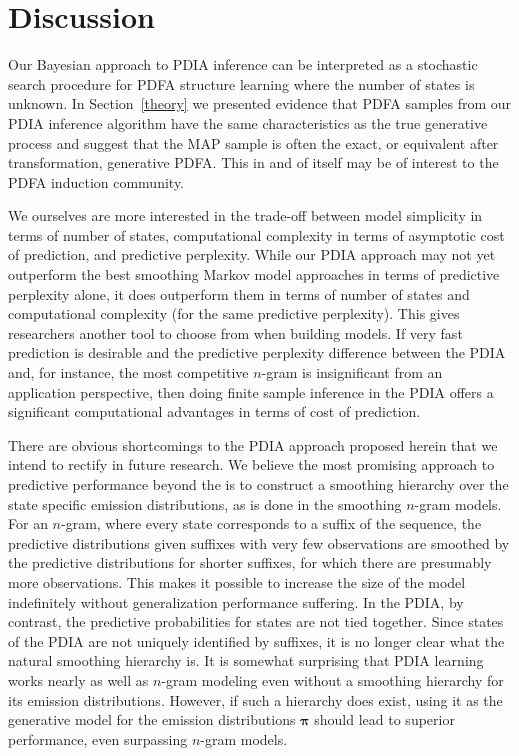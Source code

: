 \section{Discussion}
\label{sec:discussion}

Our Bayesian approach to PDIA inference can be interpreted as a stochastic search procedure for PDFA structure learning where the number of states is unknown.  In Section~\ref{theory} we presented evidence that PDFA samples from our PDIA inference algorithm have the same characteristics as the true generative process and suggest that the MAP sample is often the exact, or equivalent after transformation, generative PDFA.  This in and of itself may be of interest to the PDFA induction community.

We ourselves are more interested in the trade-off between model simplicity in terms of number of states, computational complexity in terms of asymptotic cost of prediction, and predictive perplexity.  While our PDIA approach may not yet outperform the best smoothing Markov model approaches in terms of predictive perplexity alone, it does outperform them in terms of number of states and computational complexity (for the same predictive perplexity).  This gives researchers another tool to choose from when building models.  If very fast prediction is desirable and the predictive perplexity difference between the PDIA and, for instance, the most competitive $n$-gram is insignificant from an application perspective, then doing finite sample inference in the PDIA offers a significant computational advantages in terms of cost of prediction.

There are obvious shortcomings to the PDIA approach proposed herein that we intend to rectify in future research.  We believe the most promising approach to predictive performance beyond the is to construct a smoothing hierarchy over the state specific emission distributions, as is done in the smoothing $n$-gram models.  For an $n$-gram, where every state corresponds to a suffix of the sequence, the predictive distributions given suffixes with very few observations are smoothed by the predictive distributions for shorter suffixes, for which there are presumably more observations.  This makes it possible to increase the size of the model indefinitely without generalization performance suffering.  In the PDIA, by contrast, the predictive probabilities for states are not tied together.  Since states of the PDIA are not uniquely identified by suffixes, it is no longer clear what the natural smoothing hierarchy is.  It is somewhat surprising that PDIA learning works nearly as well as $n$-gram modeling even without a smoothing hierarchy for its emission distributions.  However, if such a hierarchy does exist, using it as the generative model for the emission distributions $\boldsymbol\pi$ should lead to superior performance, even surpassing $n$-gram models.

